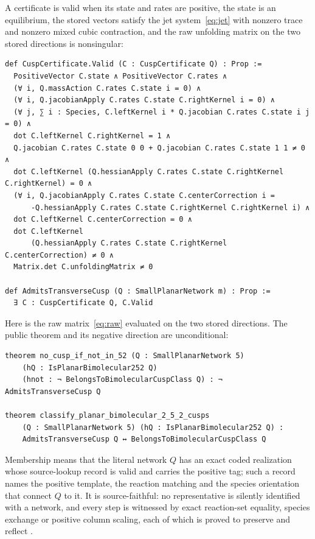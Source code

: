 \documentclass[11pt,a4paper]{article}
\theoremstyle{plain}
\theoremstyle{definition}
\theoremstyle{remark}
\numberwithin{equation}{section}
\begin{document}
A certificate is valid when its state and rates are positive, the state is an equilibrium, the stored vectors satisfy the jet system~\eqref{eq:jet} with nonzero trace and nonzero mixed cubic contraction, and the raw unfolding matrix on the two stored directions is nonsingular:

\begin{lstlisting}
def CuspCertificate.Valid (C : CuspCertificate Q) : Prop :=
  PositiveVector C.state ∧ PositiveVector C.rates ∧
  (∀ i, Q.massAction C.rates C.state i = 0) ∧
  (∀ i, Q.jacobianApply C.rates C.state C.rightKernel i = 0) ∧
  (∀ j, ∑ i : Species, C.leftKernel i * Q.jacobian C.rates C.state i j = 0) ∧
  dot C.leftKernel C.rightKernel = 1 ∧
  Q.jacobian C.rates C.state 0 0 + Q.jacobian C.rates C.state 1 1 ≠ 0 ∧
  dot C.leftKernel (Q.hessianApply C.rates C.state C.rightKernel C.rightKernel) = 0 ∧
  (∀ i, Q.jacobianApply C.rates C.state C.centerCorrection i =
      -Q.hessianApply C.rates C.state C.rightKernel C.rightKernel i) ∧
  dot C.leftKernel C.centerCorrection = 0 ∧
  dot C.leftKernel
      (Q.hessianApply C.rates C.state C.rightKernel C.centerCorrection) ≠ 0 ∧
  Matrix.det C.unfoldingMatrix ≠ 0

def AdmitsTransverseCusp (Q : SmallPlanarNetwork m) : Prop :=
  ∃ C : CuspCertificate Q, C.Valid
\end{lstlisting}

Here  is the raw matrix~\eqref{eq:raw} evaluated on the two stored directions. The public theorem and its negative direction are unconditional:

\begin{lstlisting}
theorem no_cusp_if_not_in_52 (Q : SmallPlanarNetwork 5)
    (hQ : IsPlanarBimolecular252 Q)
    (hnot : ¬ BelongsToBimolecularCuspClass Q) : ¬ AdmitsTransverseCusp Q

theorem classify_planar_bimolecular_2_5_2_cusps
    (Q : SmallPlanarNetwork 5) (hQ : IsPlanarBimolecular252 Q) :
    AdmitsTransverseCusp Q ↔ BelongsToBimolecularCuspClass Q
\end{lstlisting}

Membership  means that the literal network $Q$ has an exact coded realization whose source-lookup record is valid and carries the positive tag; such a record names the positive template, the reaction matching and the species orientation that connect $Q$ to it. It is source-faithful: no representative is silently identified with a network, and every step is witnessed by exact reaction-set equality, species exchange or positive column scaling, each of which is proved to preserve and reflect .
\end{document}

